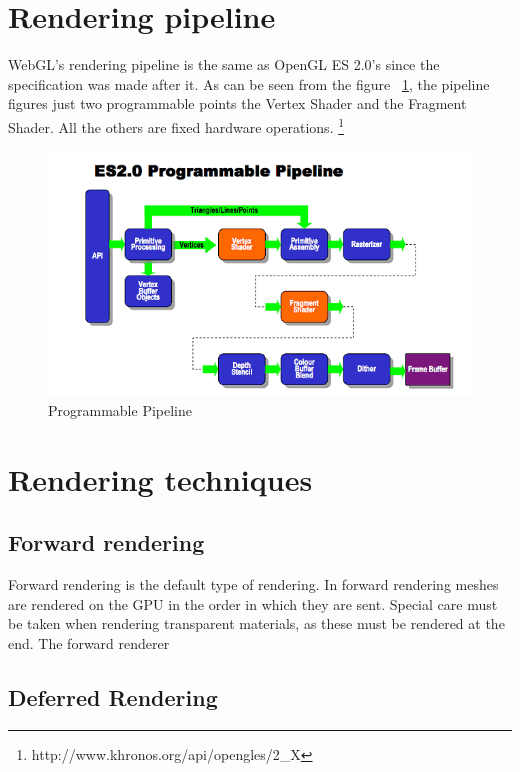 \section{Rendering pipeline}

WebGL’s rendering pipeline is the same as OpenGL ES 2.0’s since the specification was made after it. As can be seen from the figure ~\ref{img:opengles1}, the pipeline figures just two programmable points the Vertex Shader and the Fragment Shader. All the others are fixed hardware operations. \footnote{http://www.khronos.org/api/opengles/2\_X}

 \begin{center}
	\begin{figure}[here]
		
		\includegraphics[width=\textwidth]{src/img/opengles2.png}
		\caption{Programmable Pipeline}
		\label{img:opengles1}
	\end{figure}
\end{center}

\section{Rendering techniques}

\subsection{Forward rendering}

Forward rendering is the default type of rendering. In forward rendering meshes are rendered on the GPU in the order in which they are sent. Special care must be taken when rendering transparent materials, as these must be rendered at the end. The forward renderer 

\subsection{Deferred Rendering}

